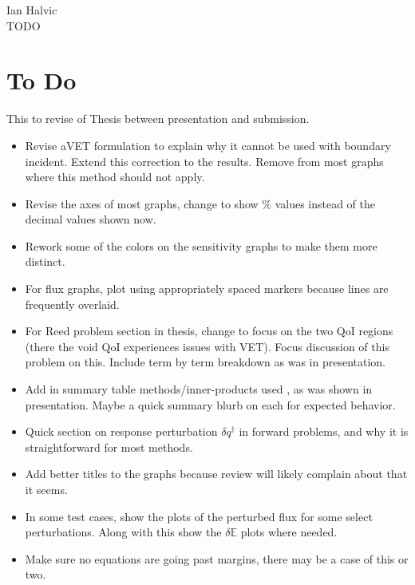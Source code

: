\documentclass{article}
\newcommand{\Edd}{\mathbb{E}}
\begin{document}
\begin{center}
Ian Halvic \\
TODO\\
\end{center}

\section{To Do}
This to revise of Thesis between presentation and submission.
\begin{itemize}
\item Revise aVET formulation to explain why it cannot be used with boundary incident. Extend this correction to the results. Remove from most graphs where this method should not apply. 
\item Revise the axes of most graphs, change to show $\%$ values instead of the decimal values shown now.
\item Rework some of the colors on the sensitivity graphs to make them more distinct.
\item For flux graphs, plot using appropriately spaced markers because lines are frequently overlaid.
\item For Reed problem section in thesis, change to focus on the two QoI regions (there the void QoI experiences issues with VET). Focus discussion of this problem on this. Include term by term breakdown as was in presentation.
\item Add in summary table methods/inner-products used , as was shown in presentation. Maybe a quick summary blurb on each for expected behavior.
\item Quick section on response perturbation $\delta q^\dag$ in forward problems, and why it is straightforward for most methods.
\item Add better titles to the graphs because review will likely complain about that it seems.
\item In some test cases, show the plots of the perturbed flux for some select perturbations. Along with this show the $\delta \Edd$ plots where needed.
\item Make sure no equations are going past margins, there may be a case of this or two. 
\end{itemize}
\end{document}
